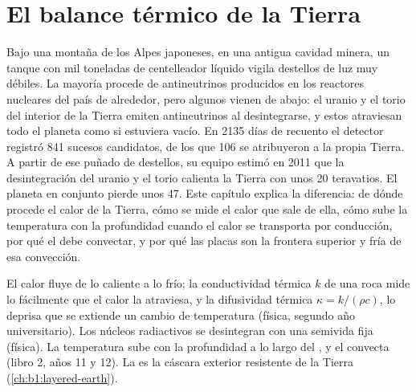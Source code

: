 \chapter{El balance térmico de la Tierra}\label{ch:b1:heat-budget}

Bajo una montaña de los Alpes japoneses, en una antigua cavidad minera, un tanque con mil toneladas de centelleador líquido
vigila destellos de luz muy débiles. La mayoría procede de antineutrinos producidos en los reactores nucleares del país de
alrededor, pero algunos vienen de abajo: el uranio y el torio del interior de la Tierra emiten antineutrinos al desintegrarse,
y estos atraviesan todo el planeta como si estuviera vacío. En 2135 días de recuento el detector registró 841 sucesos
candidatos, de los que 106 se atribuyeron a la propia Tierra. A partir de ese puñado de destellos, su equipo estimó en 2011 que
la desintegración del uranio y el torio calienta la Tierra con unos 20 teravatios. El planeta en conjunto pierde unos 47. Este
capítulo explica la diferencia: de dónde procede el calor de la Tierra, cómo se mide el calor que sale de ella, cómo sube la
temperatura con la profundidad cuando el calor se transporta por conducción, por qué el  debe convectar, y por qué las
placas son la frontera superior y fría de esa convección.

\begin{recall}
El calor fluye de lo caliente a lo frío; la conductividad térmica $k$ de una roca mide lo fácilmente que el calor la atraviesa, y
la difusividad térmica $\kappa = k/(\rho c)$, lo deprisa que se extiende un cambio de temperatura (física, segundo año
universitario). Los núcleos radiactivos se desintegran con una semivida fija (física). La temperatura sube con la profundidad a lo
largo del , y el  convecta (libro 2, años 11 y 12). La  es la cáscara exterior resistente de la Tierra
(\cref{ch:b1:layered-earth}).
\end{recall}

